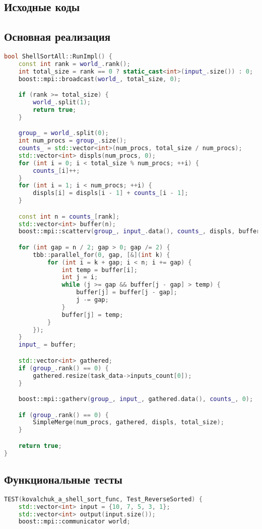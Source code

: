 \documentclass[12pt]{article}
\begin{document}
\newpage
\begin{appendices}
\section{Исходные коды}
\subsection{Основная реализация}
\begin{lstlisting}[language=C++, caption=Фрагмент кода из ops_all.cpp]
bool ShellSortAll::RunImpl() {
    const int rank = world_.rank();
    int total_size = rank == 0 ? static_cast<int>(input_.size()) : 0;
    boost::mpi::broadcast(world_, total_size, 0);

    if (rank >= total_size) {
        world_.split(1);
        return true;
    }

    group_ = world_.split(0);
    int num_procs = group_.size();
    counts_ = std::vector<int>(num_procs, total_size / num_procs);
    std::vector<int> displs(num_procs, 0);
    for (int i = 0; i < total_size % num_procs; ++i) {
        counts_[i]++;
    }
    for (int i = 1; i < num_procs; ++i) {
        displs[i] = displs[i - 1] + counts_[i - 1];
    }

    const int n = counts_[rank];
    std::vector<int> buffer(n);
    boost::mpi::scatterv(group_, input_.data(), counts_, displs, buffer.data(), n, 0);

    for (int gap = n / 2; gap > 0; gap /= 2) {
        tbb::parallel_for(0, gap, [&](int k) {
            for (int i = k + gap; i < n; i += gap) {
                int temp = buffer[i];
                int j = i;
                while (j >= gap && buffer[j - gap] > temp) {
                    buffer[j] = buffer[j - gap];
                    j -= gap;
                }
                buffer[j] = temp;
            }
        });
    }
    input_ = buffer;

    std::vector<int> gathered;
    if (group_.rank() == 0) {
        gathered.resize(task_data->inputs_count[0]);
    }

    boost::mpi::gatherv(group_, input_, gathered.data(), counts_, 0);

    if (group_.rank() == 0) {
        SimpleMerge(num_procs, gathered, displs, total_size);
    }

    return true;
}
\end{lstlisting}

\subsection{Функциональные тесты}
\begin{lstlisting}[language=C++, caption=Фрагмент кода из func_all.cpp]
TEST(kovalchuk_a_shell_sort_func, Test_ReverseSorted) {
    std::vector<int> input = {10, 7, 5, 3, 1};
    std::vector<int> output(input.size());
    boost::mpi::communicator world;


\end{lstlisting}
\end{appendices}
\end{document}
